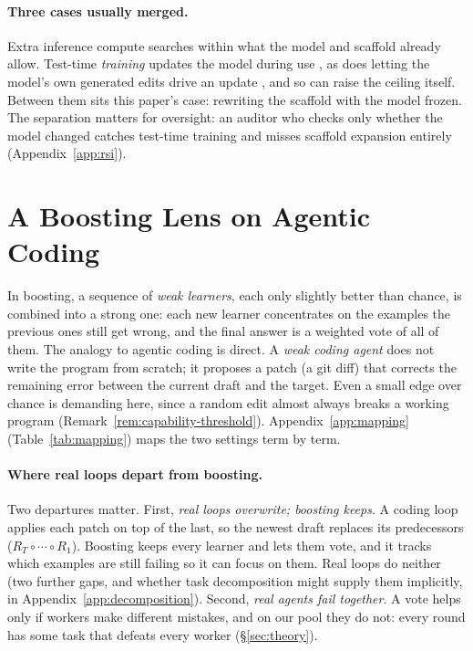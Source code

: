 \documentclass{article}
\theoremstyle{remark}
\theoremstyle{plain}
\begin{document}
\paragraph{Three cases usually merged.} Extra inference compute searches within what the model and scaffold already allow. Test-time \emph{training} updates the model during use \citep{sun2019testtime, hardt2023nearest, sun2024learning, akyurek2024testtime, hubotter2024efficiently}, as does letting the model's own generated edits drive an update \citep{zweiger2025seal}, and so can raise the ceiling itself. Between them sits this paper's case: rewriting the scaffold with the model frozen. The separation matters for oversight: an auditor who checks only whether the model changed catches test-time training and misses scaffold expansion entirely (Appendix~\ref{app:rsi}).

\section{A Boosting Lens on Agentic Coding}
\label{sec:framework}

In boosting, a sequence of \emph{weak learners}, each only slightly better than chance, is combined into a strong one: each new learner concentrates on the examples the previous ones still get wrong, and the final answer is a weighted vote of all of them. The analogy to agentic coding is direct. A \emph{weak coding agent} does not write the program from scratch; it proposes a patch (a git diff) that corrects the remaining error between the current draft and the target. Even a small edge over chance is demanding here, since a random edit almost always breaks a working program (Remark~\ref{rem:capability-threshold}). Appendix~\ref{app:mapping} (Table~\ref{tab:mapping}) maps the two settings term by term.

\paragraph{Where real loops depart from boosting.} Two departures matter. First, \emph{real loops overwrite; boosting keeps}. A coding loop applies each patch on top of the last, so the newest draft replaces its predecessors ($R_T\circ\cdots\circ R_1$). Boosting keeps every learner and lets them vote, and it tracks which examples are still failing so it can focus on them. Real loops do neither (two further gaps, and whether task decomposition might supply them implicitly, in Appendix~\ref{app:decomposition}). Second, \emph{real agents fail together}. A vote helps only if workers make different mistakes, and on our pool they do not: every round has some task that defeats every worker (\S\ref{sec:theory}).
\end{document}
